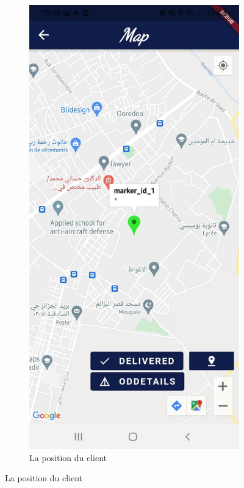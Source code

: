 \documentclass[french, a4paper, 12pt]{report}
\begin{document}
		\begin{figure}[h!]

			\begin{subfigure}{.5\textwidth}
  \centering
  \includegraphics[width=.9\linewidth]{screenshots/DeliveryViews/ClientPositionMap.jpg}
  \caption{La position du client}
  \label{fig:delcli}
\end{subfigure}

\end{figure}
\end{document}
